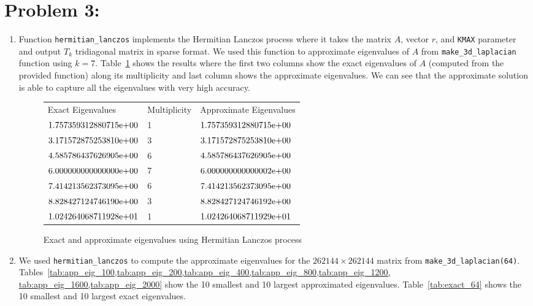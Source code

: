 \newpage
\section*{Problem 3:}
\begin{enumerate}
\item Function \texttt{hermitian\_lanczos} implements the Hermitian Lanczos process where it takes the matrix $A$, vector $r$, and \texttt{KMAX} parameter and output $T_{k}$ tridiagonal matrix in sparse format. We used this function to approximate eigenvalues of $A$ from \texttt{make\_3d\_laplacian} function using $k=7$. Table~\ref{tab:app_eig_7} shows the results where the first two columns show the exact eigenvalues of $A$ (computed from the provided function) along its multiplicity and last column shows the approximate eigenvalues. We can see that the approximate solution is able to capture all the eigenvalues with very high accuracy.

\begin{figure}[tbh]
 \centering    
\begin{tabular}{ |p{5cm}| p{2cm}|| p{5cm}|}
\hline
 Exact Eigenvalues  & Multiplicity & Approximate Eigenvalues \\ \hhline{|=|=|=|}   
${1.757359312880715}\mathrm{e}{+00}$ & 1& ${1.757359312880715}\mathrm{e}{+00}$ \\
${3.171572875253810}\mathrm{e}{+00}$ &3 & ${3.171572875253810}\mathrm{e}{+00}$ \\
${4.585786437626905}\mathrm{e}{+00}$ &6 & ${4.585786437626905}\mathrm{e}{+00}$ \\
${6.000000000000000}\mathrm{e}{+00}$ & 7& ${6.000000000000002}\mathrm{e}{+00}$ \\
${7.414213562373095}\mathrm{e}{+00}$&6 & ${7.414213562373095}\mathrm{e}{+00}$ \\
${8.828427124746190}\mathrm{e}{+00}$ &3 & ${8.828427124746192}\mathrm{e}{+00}$ \\
${1.024264068711928}\mathrm{e}{+01}$ &1 & ${1.024264068711929}\mathrm{e}{+01}$ \\
\hline
\end{tabular} 
\caption{Exact and approximate eigenvalues using Hermitian Lanczos process}
   \label{tab:app_eig_7}
\end{figure}

\item We used \texttt{hermitian\_lanczos} to compute the approximate eigenvalues for the $262144 \times 262144$ matrix from \texttt{make\_3d\_laplacian(64)}. Tables~\ref{tab:app_eig_100,tab:app_eig_200,tab:app_eig_400,tab:app_eig_800,tab:app_eig_1200, tab:app_eig_1600,tab:app_eig_2000} show the 10 smallest and 10 largest approximated eigenvalues. Table~\ref{tab:exact_64} shows the 10 smallest and 10 largest exact eigenvalues. 


\end{enumerate}
